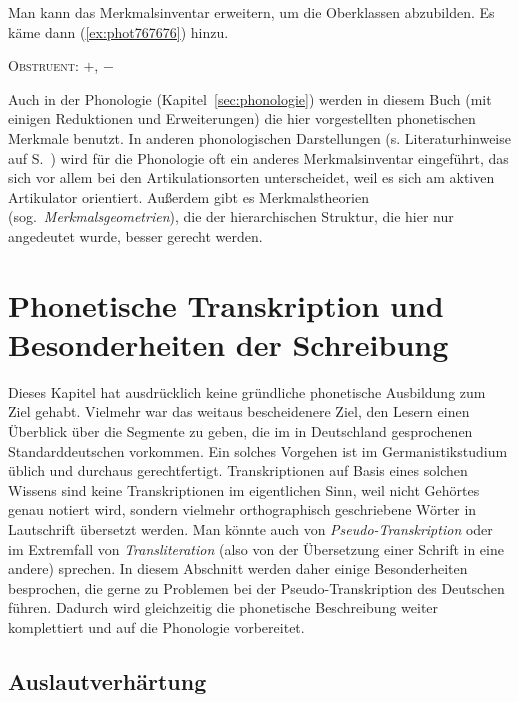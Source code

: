Man kann das Merkmalsinventar erweitern, um die Oberklassen abzubilden.
Es käme dann (\ref{ex:phot767676}) hinzu.

\begin{exe}
		\begin{xlist}
			\ex \textsc{Obstruent}: $+$, $-$
		\end{xlist}
\end{exe}

Auch in der Phonologie (Kapitel~\ref{sec:phonologie}) werden in diesem Buch (mit einigen Reduktionen und Erweiterungen) die hier vorgestellten phonetischen Merkmale benutzt.
In anderen phonologischen Darstellungen (s. Literaturhinweise auf S.~\pageref{abs:pholliteratur}) wird für die Phonologie oft ein anderes Merkmalsinventar eingeführt, das sich vor allem bei den Artikulationsorten unterscheidet, weil es sich am aktiven Artikulator orientiert.
Außerdem gibt es Merkmalstheorien (sog.\ \textit{Merkmalsgeometrien}), die der hierarchischen Struktur, die hier nur angedeutet wurde, besser gerecht werden.

\section{Phonetische Transkription und Besonderheiten der Schreibung}

\label{sec:phonetischebesonderheiten}

Dieses Kapitel hat ausdrücklich keine gründliche phonetische Ausbildung zum Ziel gehabt.
Vielmehr war das weitaus bescheidenere Ziel, den Lesern einen Überblick über die Segmente zu geben, die im in Deutschland gesprochenen Standarddeutschen vorkommen.
Ein solches Vorgehen ist im Germanistikstudium üblich und durchaus gerechtfertigt. 
Transkriptionen auf Basis eines solchen Wissens sind keine Transkriptionen im eigentlichen Sinn, weil nicht Gehörtes genau notiert wird, sondern vielmehr orthographisch geschriebene Wörter in Lautschrift übersetzt werden.
Man könnte auch von \textit{Pseudo-Transkription} oder im Extremfall von \textit{Transliteration} (also von der Übersetzung einer Schrift in eine andere) sprechen.
In diesem Abschnitt werden daher einige Besonderheiten besprochen, die gerne zu Problemen bei der Pseudo-Transkription des Deutschen führen.
Dadurch wird gleichzeitig die phonetische Beschreibung weiter komplettiert und auf die Phonologie vorbereitet.

\subsection{Auslautverhärtung}


